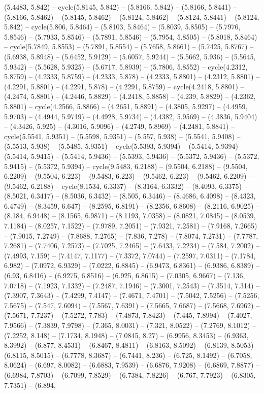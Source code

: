 (5.4483, 5.842) -- cycle(5.8145, 5.842) -- (5.8166, 5.842) -- (5.8166, 5.8441) -- (5.8166, 5.8462) -- (5.8145, 5.8462) -- (5.8124, 5.8462) -- (5.8124, 5.8441) -- (5.8124, 5.842) -- cycle(5.806, 5.8464) -- (5.8103, 5.8464) -- (5.8039, 5.8505) -- (5.7976, 5.8546) -- (5.7933, 5.8546) -- (5.7891, 5.8546) -- (5.7954, 5.8505) -- (5.8018, 5.8464) -- cycle(5.7849, 5.8553) -- (5.7891, 5.8554) -- (5.7658, 5.8661) -- (5.7425, 5.8767) -- (5.6938, 5.8948) -- (5.6452, 5.9129) -- (5.6057, 5.9244) -- (5.5662, 5.936) -- (5.5645, 5.9342) -- (5.5628, 5.9325) -- (5.6717, 5.8939) -- (5.7806, 5.8552) -- cycle(4.2312, 5.8759) -- (4.2333, 5.8759) -- (4.2333, 5.878) -- (4.2333, 5.8801) -- (4.2312, 5.8801) -- (4.2291, 5.8801) -- (4.2291, 5.878) -- (4.2291, 5.8759) -- cycle(4.2418, 5.8801) -- (4.2474, 5.8801) -- (4.2446, 5.8829) -- (4.2418, 5.8858) -- (4.239, 5.8829) -- (4.2362, 5.8801) -- cycle(4.2566, 5.8866) -- (4.2651, 5.8891) -- (4.3805, 5.9297) -- (4.4959, 5.9703) -- (4.4944, 5.9719) -- (4.4928, 5.9734) -- (4.4382, 5.9569) -- (4.3836, 5.9404) -- (4.3426, 5.925) -- (4.3016, 5.9096) -- (4.2749, 5.8969) -- (4.2481, 5.8841) -- cycle(5.5541, 5.9351) -- (5.5598, 5.9351) -- (5.557, 5.938) -- (5.5541, 5.9408) -- (5.5513, 5.938) -- (5.5485, 5.9351) -- cycle(5.5393, 5.9394) -- (5.5414, 5.9394) -- (5.5414, 5.9415) -- (5.5414, 5.9436) -- (5.5393, 5.9436) -- (5.5372, 5.9436) -- (5.5372, 5.9415) -- (5.5372, 5.9394) -- cycle(9.5483, 6.2188) -- (9.5504, 6.2188) -- (9.5504, 6.2209) -- (9.5504, 6.223) -- (9.5483, 6.223) -- (9.5462, 6.223) -- (9.5462, 6.2209) -- (9.5462, 6.2188) -- cycle(8.1534, 6.3337) -- (8.3164, 6.3332) -- (8.4093, 6.3375) -- (8.5021, 6.3417) -- (8.5036, 6.3432) -- (8.505, 6.3446) -- (8.4686, 6.4098) -- (8.4323, 6.4749) -- (8.3459, 6.647) -- (8.2595, 6.8191) -- (8.2356, 6.8608) -- (8.2116, 6.9025) -- (8.184, 6.9448) -- (8.1565, 6.9871) -- (8.1193, 7.0358) -- (8.0821, 7.0845) -- (8.0539, 7.1184) -- (8.0257, 7.1522) -- (7.9789, 7.2051) -- (7.9321, 7.2581) -- (7.9168, 7.2665) -- (7.9015, 7.2749) -- (7.8688, 7.2765) -- (7.836, 7.278) -- (7.8074, 7.2731) -- (7.7787, 7.2681) -- (7.7406, 7.2573) -- (7.7025, 7.2465) -- (7.6433, 7.2234) -- (7.584, 7.2002) -- (7.4993, 7.159) -- (7.4147, 7.1177) -- (7.3372, 7.0744) -- (7.2597, 7.0311) -- (7.1784, 6.982) -- (7.0972, 6.9329) -- (7.0222, 6.8845) -- (6.9473, 6.8361) -- (6.9386, 6.8389) -- (6.93, 6.8416) -- (6.9275, 6.8516) -- (6.925, 6.8615) -- (7.0305, 6.9667) -- (7.136, 7.0718) -- (7.1923, 7.1332) -- (7.2487, 7.1946) -- (7.3001, 7.2543) -- (7.3514, 7.314) -- (7.3907, 7.3643) -- (7.4299, 7.4147) -- (7.4671, 7.4701) -- (7.5042, 7.5256) -- (7.5256, 7.5675) -- (7.547, 7.6094) -- (7.5567, 7.6391) -- (7.5665, 7.6687) -- (7.5668, 7.6962) -- (7.5671, 7.7237) -- (7.5272, 7.783) -- (7.4873, 7.8423) -- (7.445, 7.8994) -- (7.4027, 7.9566) -- (7.3839, 7.9798) -- (7.365, 8.0031) -- (7.321, 8.0522) -- (7.2769, 8.1012) -- (7.2252, 8.148) -- (7.1734, 8.1948) -- (7.0845, 8.27) -- (6.9956, 8.3453) -- (6.9363, 8.3992) -- (6.877, 8.4531) -- (6.8467, 8.4811) -- (6.8163, 8.5092) -- (6.8139, 8.5053) -- (6.8115, 8.5015) -- (6.7778, 8.3687) -- (6.7441, 8.236) -- (6.725, 8.1492) -- (6.7058, 8.0624) -- (6.697, 8.0082) -- (6.6883, 7.9539) -- (6.6876, 7.9208) -- (6.6869, 7.8877) -- (6.6984, 7.8703) -- (6.7099, 7.8529) -- (6.7384, 7.8226) -- (6.767, 7.7923) -- (6.8305, 7.7351) -- (6.894, 